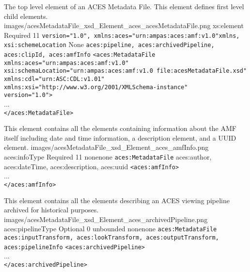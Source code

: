         {The top level element of an ACES Metadata File.  This element defines first level child elements.}
        {images/acesMetadataFile_xsd_Element_aces_acesMetadataFile.png}
        {xs:element}
        {Required}
        {1}{1}
        {\texttt{version="1.0", xmlns:aces="urn:ampas:aces:amf:v1.0"}}{\texttt{xmlns, xsi:schemeLocation}}
        {None}
        {\texttt{aces:pipeline, aces:archivedPipeline, aces:clipId, aces:amfInfo}}
        { \lstinline{<aces:MetadataFile} \\
        \lstinline{xmlns:aces="urn:ampas:aces:amf:v1.0"} \\
        \lstinline{xsi:schemaLocation="urn:ampas:aces:amf:v1.0 file:acesMetadataFile.xsd"} \\ \lstinline{xmlns:cdl="urn:ASC:CDL:v1.01"}\\
        \lstinline{xmlns:xsi="http://www.w3.org/2001/XMLSchema-instance"}\\
        \lstinline{version="1.0">}\\
        ... \\
        \lstinline{</aces:MetadataFile>}}
        
        {This element contains all the elements containing information about the AMF itself including date and time information, a description element, and a UUID element.}
        {images/acesMetadataFile_xsd_Element_aces_amfInfo.png}
        {aces:infoType}
        {Required}
        {1}{1}
        {none}{none}
        {\texttt{aces:MetadataFile}}
        {aces:author, aces:dateTime, aces:description, aces:uuid}
        {\lstinline{<aces:amfInfo>} \\
        ... \\
        \lstinline{</aces:amfInfo>}}

        {This element contains all the elements describing an ACES viewing pipeline archived for historical purposes.}
        {images/acesMetadataFile_xsd_Element_aces_archivedPipeline.png}
        {aces:pipelineType}
        {Optional}
        {0}
        {unbounded}
        {none}{none}
        {\texttt{aces:MetadataFile}}
        {\texttt{aces:inputTransform, aces:lookTransform, aces:outputTransform, \\ aces:pipelineInfo}}
        {\lstinline{<aces:archivedPipeline>} \\
        ... \\
        \lstinline{</aces:archivedPipeline>}}  

